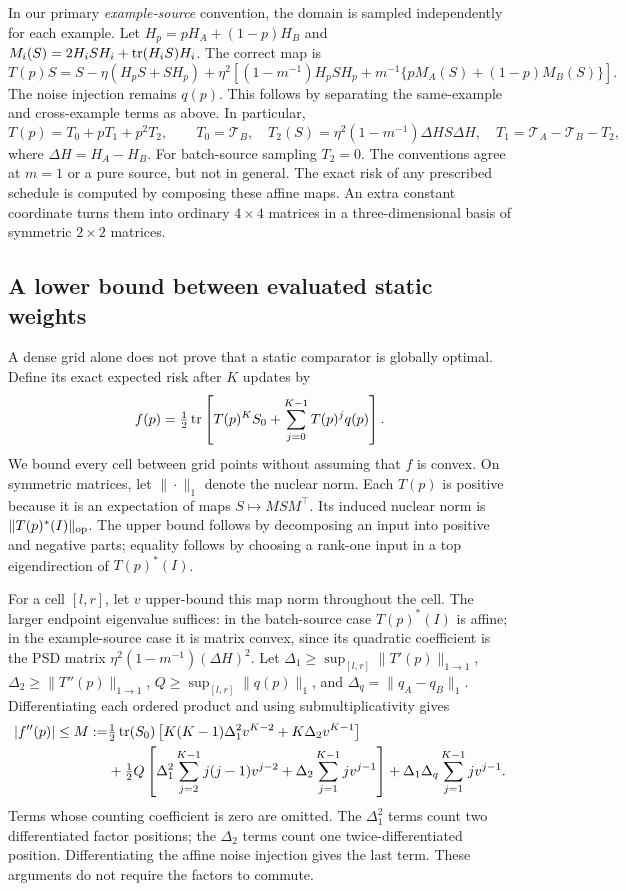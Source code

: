 In our primary \emph{example-source} convention, the domain is sampled independently for each example. Let $H_p=pH_A+(1-p)H_B$ and $M_i(S)=2H_iSH_i+\operatorname{tr}(H_iS)H_i$. The correct map is
\begin{equation}
 T(p)S=S-\eta(H_pS+SH_p)+\eta^2\left[(1-m^{-1})H_pSH_p+m^{-1}\{pM_A(S)+(1-p)M_B(S)\}\right].\label{eq:example_moment}
\end{equation}
The noise injection remains $q(p)$. This follows by separating the same-example and cross-example terms as above. In particular,
\[
 T(p)=T_0+pT_1+p^2T_2,\qquad
 T_0=\mathcal T_B,\quad T_2(S)=\eta^2(1-m^{-1})\Delta H S\Delta H,\quad
 T_1=\mathcal T_A-\mathcal T_B-T_2,
\]
where $\Delta H=H_A-H_B$. For batch-source sampling $T_2=0$. The conventions agree at $m=1$ or a pure source, but not in general. The exact risk of any prescribed schedule is computed by composing these affine maps. An extra constant coordinate turns them into ordinary $4\times4$ matrices in a three-dimensional basis of symmetric $2\times2$ matrices.

\subsection{A lower bound between evaluated static weights}
A dense grid alone does not prove that a static comparator is globally optimal. Define its exact expected risk after $K$ updates by
\[
 f(p)=\tfrac12\operatorname{tr}\left[T(p)^KS_0+\sum_{j=0}^{K-1}T(p)^jq(p)\right].
\]
We bound every cell between grid points without assuming that $f$ is convex. On symmetric matrices, let $\|\cdot\|_1$ denote the nuclear norm. Each $T(p)$ is positive because it is an expectation of maps $S\mapsto MSM^\top$. Its induced nuclear norm is $\|T(p)^*(I)\|_{\mathrm{op}}$. The upper bound follows by decomposing an input into positive and negative parts; equality follows by choosing a rank-one input in a top eigendirection of $T(p)^*(I)$.

For a cell $[l,r]$, let $v$ upper-bound this map norm throughout the cell. The larger endpoint eigenvalue suffices: in the batch-source case $T(p)^*(I)$ is affine; in the example-source case it is matrix convex, since its quadratic coefficient is the PSD matrix $\eta^2(1-m^{-1})(\Delta H)^2$. Let $\Delta_1\ge\sup_{[l,r]}\|T'(p)\|_{1\to1}$, $\Delta_2\ge\|T''(p)\|_{1\to1}$, $Q\ge\sup_{[l,r]}\|q(p)\|_1$, and $\Delta_q=\|q_A-q_B\|_1$. Differentiating each ordered product and using submultiplicativity gives
\begin{align}
 |f''(p)|\le M:=&\tfrac12\operatorname{tr}(S_0)\left[K(K-1)\Delta_1^2v^{K-2}+K\Delta_2v^{K-1}\right]\nonumber\\
 &+\tfrac12Q\left[\Delta_1^2\sum_{j=2}^{K-1}j(j-1)v^{j-2}+\Delta_2\sum_{j=1}^{K-1}jv^{j-1}\right]
 +\Delta_1\Delta_q\sum_{j=1}^{K-1}jv^{j-1}.\label{eq:sgd_curvature}
\end{align}
Terms whose counting coefficient is zero are omitted. The $\Delta_1^2$ terms count two differentiated factor positions; the $\Delta_2$ terms count one twice-differentiated position. Differentiating the affine noise injection gives the last term. These arguments do not require the factors to commute.

